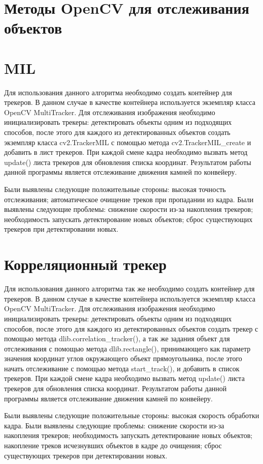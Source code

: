 \documentclass[specification,annotation,times]{itmo-student-thesis}
\begin{document}
\section{Методы OpenCV для отслеживания объектов}
\section{MIL}
Для использования данного алгоритма необходимо создать контейнер для трекеров. В данном случае в качестве контейнера используется экземпляр класса OpenCV MultiTracker.
Для отслеживания изображения необходимо инициализировать трекеры: детектировать объекты одним из подходящих способов, после этого для каждого из детектированных объектов создать экземпляр класса cv2.TrackerMIL с помощью метода cv2.TrackerMIL\_create и добавить в лист трекеров. При каждой смене кадра необходимо вызвать метод update()  листа трекеров для обновления списка координат. 
Результатом работы данной программы является отслеживание движения камней по конвейеру.


Были выявлены следующие положительные стороны:
высокая точность отслеживания;
автоматическое очищение треков при пропадании из кадра.
Были выявлены следующие проблемы:
снижение скорости из-за накопления трекеров;
необходимость запускать детектирование новых объектов;
сброс существующих трекеров при детектировании новых.

\section{Корреляционный трекер}
Для использования данного алгоритма так же необходимо создать контейнер для трекеров. В данном случае в качестве контейнера используется экземпляр класса OpenCV MultiTracker.
Для отслеживания изображения необходимо инициализировать трекеры: детектировать объекты одним из подходящих способов, после этого для каждого из детектированных объектов создать трекер с помощью метода dlib.correlation\_tracker(), а так же задания объект для отслеживания с помощью метода dlib.rectangle(), принимающего как параметр значения координат углов окружающего объект прямоугольника, после этого начать отслеживание с помощью метода start\_track(), и добавить в список трекеров. При каждой смене кадра необходимо вызвать метод update()  листа трекеров для обновления списка координат. 
Результатом работы данной программы является отслеживание движения камней по конвейеру.

Были выявлены следующие положительные стороны:
высокая скорость обработки кадра.
Были выявлены следующие проблемы:
снижение скорости из-за накопления трекеров;
необходимость запускать детектирование новых объектов;
накопление треков исчезнувших объектов в кадре до очищения;
сброс существующих трекеров при детектировании новых.
\end{document}
